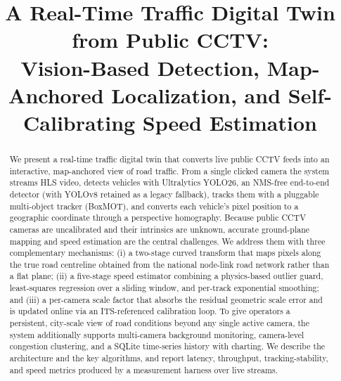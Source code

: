 \documentclass[conference]{IEEEtran}
\renewcommand{\_}{\textunderscore\allowbreak}
\begin{document}
\title{A Real-Time Traffic Digital Twin from Public CCTV:\\
Vision-Based Detection, Map-Anchored Localization, and Self-Calibrating Speed Estimation}

\author{
\and
{}
}

\maketitle

\begin{abstract}
We present a real-time traffic digital twin that converts live public CCTV feeds
into an interactive, map-anchored view of road traffic. From a single clicked
camera the system streams HLS video, detects vehicles with Ultralytics YOLO26, an NMS-free end-to-end detector
(with YOLOv8 retained as a legacy fallback), tracks them
with a pluggable multi-object tracker (BoxMOT), and converts each vehicle's pixel
position to a geographic coordinate through a perspective homography. Because
public CCTV cameras are uncalibrated and their intrinsics are unknown, accurate
ground-plane mapping and speed estimation are the central challenges. We address
them with three complementary mechanisms: (i) a two-stage curved transform
that maps pixels along the true road centreline obtained from the national
node-link road network rather than a flat plane; (ii) a five-stage speed estimator
combining a physics-based outlier guard, least-squares regression over a sliding
window, and per-track exponential smoothing; and (iii) a per-camera
scale factor that absorbs the residual geometric scale error and
is updated online via an ITS-referenced calibration loop. To give operators a persistent, city-scale view of road conditions beyond any
single active camera, the system additionally supports multi-camera background
monitoring, camera-level congestion clustering, and a SQLite time-series history
with charting. We describe the architecture and the key algorithms, and report
latency, throughput, tracking-stability, and speed metrics produced by a
measurement harness over live streams.
\end{abstract}
\end{document}
